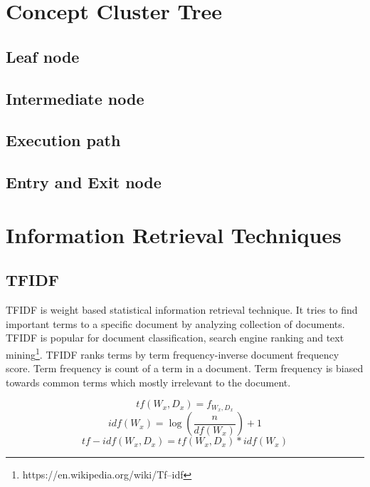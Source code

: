 \section{Concept Cluster Tree}
\subsection{Leaf node}
\subsection{Intermediate node}
\subsection{Execution path}
\subsection{Entry and Exit node}
\section{Information Retrieval Techniques}
\subsection{TFIDF}
TFIDF is weight based statistical information retrieval technique. It tries to find important terms to a specific document by analyzing collection of documents. TFIDF is popular for document classification, search engine ranking and text mining\footnote{https://en.wikipedia.org/wiki/Tf–idf}. TFIDF ranks terms by term frequency-inverse document frequency score. Term frequency is count of a term in a document. Term frequency is biased towards common terms which mostly irrelevant to the document. 

\begin{equation}
    tf (W_x, D_x) = f_{W_x,D_x}
    \label{eq:tf_background}
\end{equation}
\begin{equation}
    idf(W_x) = \log(\frac{n}{df(W_x)})+1
    \label{eq:idf_background}
\end{equation}
\begin{equation}
    tf-idf(W_x, D_x) = tf(W_x,D_x) * idf(W_x)
    \label{eq:TFIDF_background}
\end{equation}


